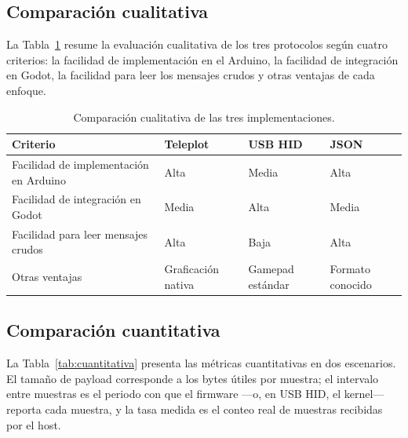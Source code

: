 \documentclass[journal]{IEEEtran}
\begin{document}
\subsection{Comparación cualitativa}

La Tabla~\ref{tab:cualitativa} resume la evaluación cualitativa de los tres protocolos según cuatro criterios: la facilidad de implementación en el Arduino, la facilidad de integración en Godot, la facilidad para leer los mensajes crudos y otras ventajas de cada enfoque.

\begin{table}[htbp]
    \centering
    \caption{Comparación cualitativa de las tres implementaciones.}
    \label{tab:cualitativa}
    \scriptsize
    \begin{tabular}{@{}>{\raggedright\arraybackslash}p{2.3cm}>{\raggedright\arraybackslash}p{1.4cm}>{\raggedright\arraybackslash}p{1.5cm}>{\raggedright\arraybackslash}p{1.5cm}@{}}
        \toprule
        \textbf{Criterio} & \textbf{Teleplot} & \textbf{USB HID} & \textbf{JSON} \\
        \midrule
        Facilidad de implementación en Arduino & Alta & Media & Alta \\
        Facilidad de integración en Godot & Media & Alta & Media \\
        Facilidad para leer mensajes crudos & Alta & Baja & Alta \\
        Otras ventajas & Graficación nativa & Gamepad estándar & Formato conocido \\
        \bottomrule
    \end{tabular}
\end{table}

\subsection{Comparación cuantitativa}

La Tabla~\ref{tab:cuantitativa} presenta las métricas cuantitativas en dos escenarios. El tamaño de payload corresponde a los bytes útiles por muestra; el intervalo entre muestras es el periodo con que el firmware ---o, en USB HID, el kernel--- reporta cada muestra, y la tasa medida es el conteo real de muestras recibidas por el host.
\end{document}
